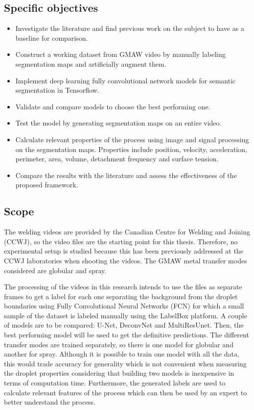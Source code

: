 \begin{intro}
\subsection{Specific objectives}
\begin{itemize}
    \item Investigate the literature and find previous work on the subject to have as a baseline for comparison.
    \item Construct a working dataset from GMAW video by manually labeling segmentation maps and artificially augment them.
    \item Implement deep learning fully convolutional network models for semantic segmentation in Tensorflow.
    \item Validate and compare models to choose the best performing one.
    \item Test the model by generating segmentation maps on an entire video.
    \item Calculate relevant properties of the process using image and signal processing on the segmentation maps. Properties include position, velocity, acceleration, perimeter, area, volume, detachment frequency and surface tension.
    \item Compare the results with the literature and assess the effectiveness of the proposed framework.

\end{itemize}

\subsection{Scope}

The welding videos are provided by the Canadian Centre for Welding and Joining (CCWJ), so the video files are the starting point for this thesis. Therefore, no experimental setup is studied because this has been previously addressed at the CCWJ laboratories when shooting the videos. The GMAW metal transfer modes considered are globular and spray.

The processing of the videos in this research intends to use the files as separate frames to get a label for each one separating the background from the droplet boundaries using Fully Convolutional Neural Networks (FCN) for which a small sample of the dataset is labeled manually using the LabelBox platform. A couple of models are to be compared: U-Net, DeconvNet and MultiResUnet. Then, the best performing model will be used to get the definitive predictions. The different transfer modes are trained separately, so there is one model for globular and another for spray. Although it is possible to train one model with all the data, this would trade accuracy for generality which is not convenient when measuring the droplet properties considering that building two models is inexpensive in terms of computation time. Furthermore, the generated labels are used to calculate relevant features of the process which can then be used by an expert to better understand the process.


\end{intro}
